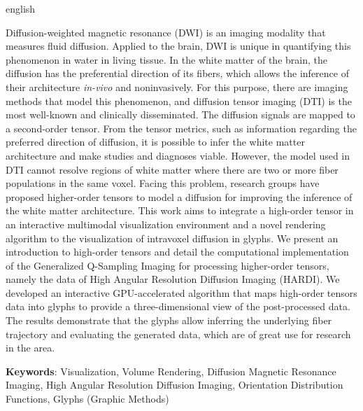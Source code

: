 \documentclass[
    12pt,                %
    oneside,            %
    a4paper,            %
    english,            %
    french,                %
    spanish,            %
    brazil                %
    ]{abntex2}
\begin{document}
\pagebreak
%
\begin{resumo}[Abstract]
 \begin{otherlanguage*}{english}

Diffusion-weighted magnetic resonance (DWI) is an imaging modality that measures fluid diffusion. Applied to the brain, DWI is unique in quantifying this phenomenon in water in living tissue. In the white matter of the brain, the diffusion has the preferential direction of its fibers, which allows the inference of their architecture \textit{in-vivo} and noninvasively. For this purpose, there are imaging methods that model this phenomenon, and diffusion tensor imaging (DTI) is the most well-known and clinically disseminated. The diffusion signals are mapped to a second-order tensor. From the tensor metrics, such as information regarding the preferred direction of diffusion, it is possible to infer the white matter architecture and make studies and diagnoses viable. However, the model used in DTI cannot resolve regions of white matter where there are two or more fiber populations in the same voxel. Facing this problem, research groups have proposed higher-order tensors to model a diffusion for improving the inference of the white matter architecture. This work aims to integrate a high-order tensor in an interactive multimodal visualization environment and a novel rendering algorithm to the visualization of intravoxel diffusion in glyphs. We present an introduction to high-order tensors and detail the computational implementation of the Generalized Q-Sampling Imaging for processing higher-order tensors, namely the data of High Angular Resolution Diffusion Imaging (HARDI). We developed an interactive GPU-accelerated algorithm that maps high-order tensors data into glyphs to provide a three-dimensional view of the post-processed data. The results demonstrate that the glyphs allow inferring the underlying fiber trajectory and evaluating the generated data, which are of great use for research in the area.


\vspace{\onelineskip}
\noindent\textbf{Keywords}: Visualization, Volume Rendering, Diffusion Magnetic Resonance Imaging, High Angular Resolution Diffusion Imaging, Orientation Distribution Functions, Glyphs (Graphic Methods)
 \end{otherlanguage*}
\end{resumo}
\end{document}
